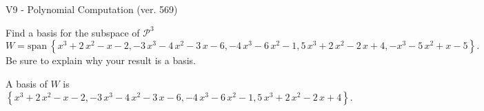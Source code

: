 \begin{exercise}
  \begin{exerciseTitle}V9 - Polynomial Computation (ver. 569)\end{exerciseTitle}
  \begin{exerciseStatement}
    Find a basis for the subspace of \(\mathcal{P}^3\) 
\[W=\mathrm{span}\ \left\{x^{3} + 2 \, x^{2} - x - 2 , -3 \, x^{3} - 4 \, x^{2} - 3 \, x - 6 , -4 \, x^{3} - 6 \, x^{2} - 1 , 5 \, x^{3} + 2 \, x^{2} - 2 \, x + 4 , -x^{3} - 5 \, x^{2} + x - 5\right\}.\]
 Be sure to explain why your result is a basis.


  \end{exerciseStatement}
  \begin{exerciseAnswer}
   A basis of \(W\) is  \(\left\{x^{3} + 2 \, x^{2} - x - 2 , -3 \, x^{3} - 4 \, x^{2} - 3 \, x - 6 , -4 \, x^{3} - 6 \, x^{2} - 1 , 5 \, x^{3} + 2 \, x^{2} - 2 \, x + 4\right\}\).
  


  \end{exerciseAnswer}
\end{exercise}